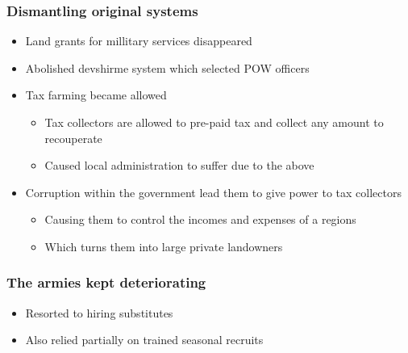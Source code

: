\documentclass[letterpaper]{article}
\begin{document}
\subsubsection{Dismantling original systems}
\label{sec:org996ec70}
\begin{itemize}
\item Land grants for millitary services disappeared
\item Abolished devshirme system which selected POW officers
\item Tax farming became allowed

\begin{itemize}
\item Tax collectors are allowed to pre-paid tax and collect any amount to
recouperate
\item Caused local administration to suffer due to the above
\end{itemize}

\item Corruption within the government lead them to give power to tax
collectors

\begin{itemize}
\item Causing them to control the incomes and expenses of a regions
\item Which turns them into large private landowners
\end{itemize}
\end{itemize}

\subsubsection{The armies kept deteriorating}
\label{sec:org1c414a1}
\begin{itemize}
\item Resorted to hiring substitutes
\item Also relied partially on trained seasonal recruits
\end{itemize}
\end{document}
